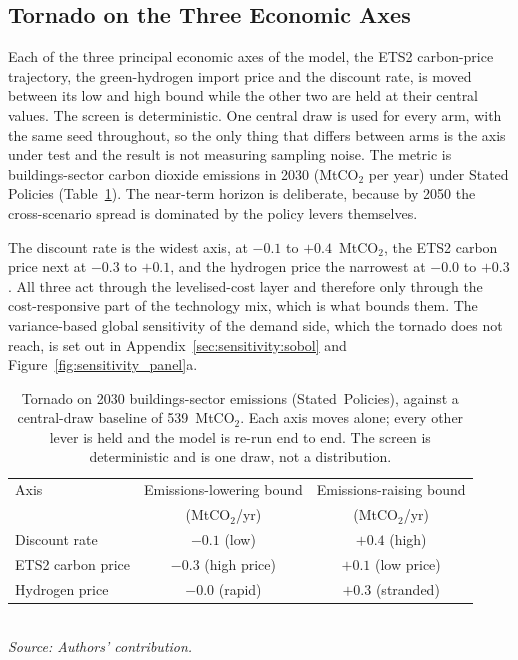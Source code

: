 \subsection{Tornado on the Three Economic Axes}
\label{sec:sensitivity:tornado}

Each of the three principal economic axes of the model, the ETS2 carbon-price
trajectory, the green-hydrogen import price and the discount rate, is moved between its
low and high bound while the other two are held at their central values. The screen is
deterministic. One central draw is used for every arm, with the same seed throughout, so
the only thing that differs between arms is the axis under test and the result is not
measuring sampling noise. The metric is buildings-sector carbon dioxide emissions in
2030 (MtCO$_2$ per year) under Stated Policies (Table~\ref{tab:tornado}). The near-term
horizon is deliberate, because by 2050 the cross-scenario spread is dominated by the
policy levers themselves.

The discount rate is the widest axis, at $-0.1$ to $+0.4$~MtCO$_2$, the ETS2 carbon
price next at $-0.3$ to $+0.1$, and the hydrogen price the narrowest at $-0.0$ to
$+0.3$. All three act through the levelised-cost layer and therefore only through the
cost-responsive part of the technology mix, which is what bounds them. The
variance-based global sensitivity of the demand side, which the tornado does not reach,
is set out in Appendix~\ref{sec:sensitivity:sobol} and
Figure~\ref{fig:sensitivity_panel}a.

\begin{table}[H]
    \centering
    \caption{Tornado on 2030 buildings-sector emissions (Stated~Policies), against a
    central-draw baseline of 539~MtCO$_2$. Each axis moves alone; every other lever is
    held and the model is re-run end to end. The screen is deterministic and is one draw,
    not a distribution.}
    \label{tab:tornado}
    \begin{tabular}{lcc}
        \toprule
        Axis & Emissions-lowering bound & Emissions-raising bound \\
        & (MtCO$_2$/yr) & (MtCO$_2$/yr) \\
        \midrule
        Discount rate     & $-0.1$ (low)        & $+0.4$ (high) \\
        ETS2 carbon price & $-0.3$ (high price) & $+0.1$ (low price) \\
        Hydrogen price    & $-0.0$ (rapid)      & $+0.3$ (stranded) \\
        \bottomrule
    \end{tabular}
    \\[8pt]{\footnotesize\textit{Source: Authors' contribution.}}
\end{table}

